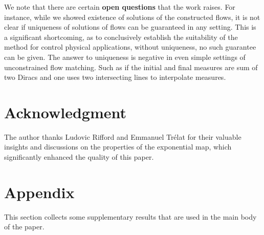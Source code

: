\documentclass{article}
\newtheorem{proposition}[theorem]{Proposition}
\begin{document}
We note that there are certain \textbf{open questions} that the work raises. For instance, while we showed existence of solutions of the constructed flows, it is not clear if uniqueness of solutions of flows can be guaranteed in any setting. This is a significant shortcoming, as to conclusively establish the suitability of the method for control physical applications, without uniqueness, no such guarantee can be given. The answer to uniqueness is negative in even simple settings of unconstrained flow matching. Such as if the initial and final measures are sum of two Diracs and one uses two intersecting lines to interpolate measures.

\section{Acknowledgment}

The author thanks Ludovic Rifford and Emmanuel Trélat for their valuable insights and discussions on the properties of the exponential map, which significantly enhanced the quality of this paper.

\FloatBarrier
\appendix

\section{Appendix}
This section collects some supplementary results that are used in the main body of the paper.


\end{document}

